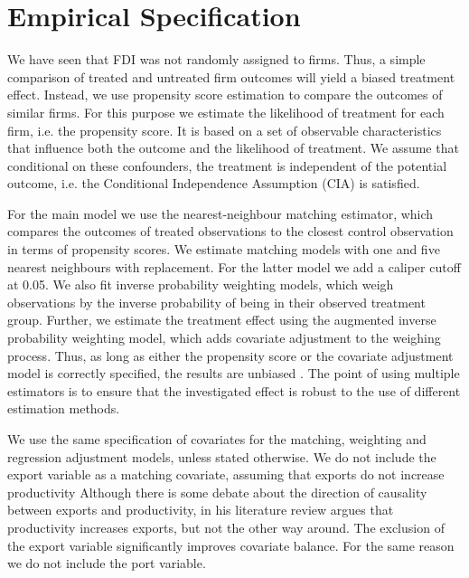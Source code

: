 \documentclass[a4paper,11pt]{scrartcl}
\begin{document}
\newpage
\section{Empirical Specification}

We have seen that FDI was not randomly assigned to firms. Thus, a simple comparison of treated and untreated firm outcomes will yield a biased treatment effect. %
Instead, we use propensity score estimation to compare the outcomes of similar firms. For this purpose we estimate the likelihood of treatment for each firm, i.e. the propensity score. It is based on a set of observable characteristics that influence both the outcome and the likelihood of treatment. We assume that conditional on these confounders, the treatment is independent of the potential outcome, i.e. the Conditional Independence Assumption (CIA) is satisfied. 

For the main model we use the nearest-neighbour matching estimator, which compares the outcomes of treated observations to the closest control observation in terms of propensity scores. We estimate matching models  with one and five nearest neighbours with replacement. For the latter model we add a caliper cutoff at 0.05. We also fit inverse probability weighting models, which weigh observations by the inverse probability of being in their observed treatment group. Further, we estimate the treatment effect using the augmented inverse probability weighting model, which adds covariate adjustment to the weighing process. Thus, as long as either the propensity score or the covariate adjustment model is correctly specified, the results are unbiased \citep[p.~393]{imbens2015}. The point of using multiple estimators is  to ensure that the investigated effect is robust to the use of different estimation methods.  

We use the same specification of covariates for the matching, weighting and regression adjustment models, unless stated otherwise. We do not include the export variable as a matching covariate, assuming that exports do not increase productivity
Although there is some debate about the direction of causality between exports and productivity, in his literature review \citet{wagner2007} argues that productivity increases exports, but not the other way around. The exclusion of the export variable significantly improves covariate balance. For the same reason we do not include the port variable.
\end{document}
